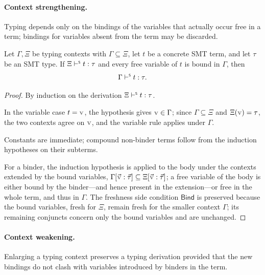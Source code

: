 \paragraph{Context strengthening.}
Typing depends only on the bindings of the variables that actually occur free in
a term; bindings for variables absent from the term may be discarded.

\begin{theorem}
  \label{thm:smt-strengthening}
  Let \(\Gamma, \Xi\) be typing contexts with
  \(\Gamma \subseteq \Xi\), let \(t\) be a concrete SMT term, and let
  \(\tau\) be an SMT type. If \(\Xi \vdash^{\scriptscriptstyle{\mathsf{S}}} t : \tau\) and every free
  variable of \(t\) is bound in \(\Gamma\), then
  \[
    \Gamma \vdash^{\scriptscriptstyle{\mathsf{S}}} t : \tau.
  \]
\end{theorem}
\begin{proof}
  By induction on the derivation \(\Xi \vdash^{\scriptscriptstyle{\mathsf{S}}} t : \tau\).
  
  In the variable case \(t = \var{v}\),
  the hypothesis gives \(\var{v} \in \Gamma\); since
  \(\Gamma \subseteq \Xi\) and \(\Xi(\var{v}) = \tau\), the two contexts
  agree on \(\var{v}\), and the variable rule applies under \(\Gamma\).
  
  Constants are immediate; compound non-binder terms follow from the induction
  hypotheses on their subterms.
  
  For a binder, the induction hypothesis is applied to the body under the contexts extended by the
  bound variables, \(\Gamma[\vec{\var{v}}:\vec\tau] \subseteq \Xi[\vec{\var{v}}:\vec\tau]\); a free variable of the body is either bound by the binder---and
  hence present in the extension---or free in the whole term, and thus in
  \(\Gamma\). The freshness side condition \(\mathsf{Bind}\) is preserved because the
  bound variables, fresh for \(\Xi\), remain fresh for the smaller context \(\Gamma\);
  its remaining conjuncts concern only the bound variables and are unchanged.
\end{proof}

\paragraph{Context weakening.}
Enlarging a typing context preserves a typing derivation provided that the new
bindings do not clash with variables introduced by binders in the term.

